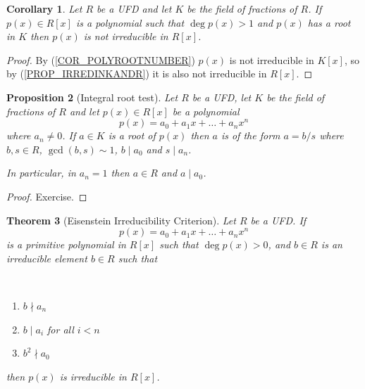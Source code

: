\documentclass[12pt, letterpaper, oneside]{article}
\theoremstyle{plain}
\newtheorem{theorem}{Theorem}[section]
\newtheorem{proposition}[theorem]{Proposition}
\newtheorem{corollary}[theorem]{Corollary}
\theoremstyle{definition}
\newcommand{\benu}{\begin{enumerate}}
\newcommand{\eenu}{\end{enumerate}}
\newcommand{\vs}{\vskip 5mm}
\newcommand{\isep}[1][0]{\setlength{\itemsep}{#1 mm}}
\begin{document}
\vs\vs 

\begin{corollary}
Let $R$ be a UFD and let $K$ be the field of fractions of $R$. If $p(x)\in R[x]$ 
is a polynomial such that $\deg p(x) > 1$ and $p(x)$
has a root in  $K$ then $p(x)$ is not irreducible in $R[x]$. 
\end{corollary}
 
\vs 

\begin{proof}
By  (\ref{COR_POLYROOTNUMBER}) $p(x)$ is not irreducible in $K[x]$, so by 
(\ref{PROP_IRREDINKANDR}) it is also not irreducible in $R[x]$.
\end{proof} 
 
\vs\vs


\begin{proposition}[Integral root test] 
 Let $R$ be a UFD, let $K$ be the field of fractions of $R$ and let $p(x)\in R[x]$
 be a polynomial 
 $$p(x) = a_{0} +a_{1}x + {\dots} + a_{n}x^{n}$$
 where $a_{n}\neq 0$. If $a\in K$ is a root of $p(x)$ then $a$ is of the form $a = b/s$ 
 where $b, s\in R$, $\gcd(b,s)\sim 1$, $b\mid a_{0}$ and $s\mid a_{n}$.
 
 In particular, in $a_{n}=1$ then $a\in R$ and $a\mid a_{0}$. 
\end{proposition} 
 
 
\vs

\begin{proof}
Exercise.
\end{proof} 
 
\vs\vs

\begin{theorem}[Eisenstein Irreducibility Criterion]
\label{THM_EISENSTEINIRRED}
Let $R$ be a UFD. If   
$$p(x) = a_{0} + a_{1}x + {\dots} + a_{n}x^{n}$$
is a primitive polynomial in $R[x]$ such that $\deg p(x) > 0$, and $b\in R$  is 
an irreducible element $b\in R$
such that 

\vskip -13mm

\  
\benu
\isep[0]
\item $b\nmid a_{n}$
\item $b\mid a_{i}$ for all $i<n$
\item $b^{2}\nmid a_{0}$
\eenu

\vskip -5mm

then $p(x)$ is irreducible in $R[x]$.

\end{theorem}
 

\vs
\end{document}
